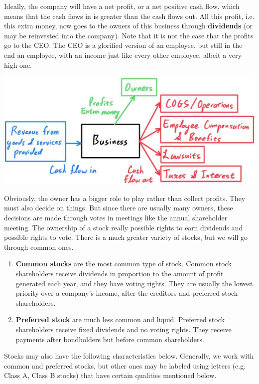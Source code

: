 \documentclass{article}
\begin{document}
Ideally, the company will have a net profit, or a net positive cash flow, which means that the cash flows in is greater than the cash flows out. All this profit, i.e. this extra money, now goes to the owners of this business through \textbf{dividends} (or may be reinvested into the company). Note that it is not the case that the profits go to the CEO. The CEO is a glorified version of an employee, but still in the end an employee, with an income just like every other employee, albeit a very high one. 
\begin{center}
    \includegraphics[scale=0.27]{img/Business_Cash_Flow.jpg}
\end{center}
Obviously, the owner has a bigger role to play rather than collect profits. They must also decide on things. But since there are usually many owners, these decisions are made through votes in meetings like the annual shareholder meeting. The ownership of a stock really possible rights to earn dividends and possible rights to vote. There is a much greater variety of stocks, but we will go through common ones.
\begin{enumerate}
    \item \textbf{Common stocks} are the most common type of stock. Common stock shareholders receive dividends in proportion to the amount of profit generated each year, and they have voting rights. They are usually the lowest priority over a company's income, after the creditors and preferred stock shareholders. 
    \item \textbf{Preferred stock} are much less common and liquid. Preferred stock shareholders receive fixed dividends and no voting rights. They receive payments after bondholders but before common shareholders. 
\end{enumerate}
Stocks may also have the following characteristics below. Generally, we work with common and preferred stocks, but other ones may be labeled using letters (e.g. Class A, Class B stocks) that have certain qualities mentioned below. 
\end{document}
